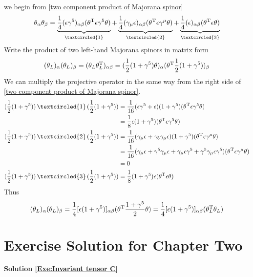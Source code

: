 we begin from \eqref{two component product of Majorana spinor}
\begin{equation}
\tht_{\a}\tht_{\be} = 
\underbrace{\frac{1}{4} (\e\g^5)_{\a\be} (\tht^{\tra}\e\g^5\tht)}_{\textcircled{1}}+ 
\underbrace{\frac{1}{4}(\g_{\m}\e)_{\a\be}({\tht}^{\tra}\e\g^{\m}\tht)}_{\textcircled{2}}+
\underbrace{\frac{1}{4}(\e)_{\a\be}(\tht^{\tra}\e\tht)}_{\textcircled{3}}
\notag
\end{equation} 
Write the product of two left-hand Majorana spinors
in matrix form
\begin{equation}
(\theta_L)_{\alpha}(\theta_L)_{\beta} 
=(\theta_L\theta_L^{\text{T}})_{\alpha\beta} 
=(\frac{1}{2}(1+\gamma^5)\theta)_{\alpha}
 (\theta^{\text{T}}\frac{1}{2}(1+\gamma^5))_{\beta} 
\end{equation} 
We can multiply the projective operator in the same way from the right side of \eqref{two component product of Majorana spinor}. 
\begin{align}
(\half(1+\g^5))\,\textcircled{1}\,(\half(1+\g^5)) 
& = \frac{1}{16} (\e\g^5+\e)(1+\g^5)
(\tht^{\tra}\e\g^5\tht)
\notag \\
& = \frac{1}{8}\e(1+\g^5)
(\tht^{\tra}\e\g^5\tht) \notag\\
(\half(1+\g^5))\,\textcircled{2}\,(\half(1+\g^5)) 
& = \frac{1}{16}
(\g_\m\e + \g_5\g_\m\e)(1+\g^5)
(\tht^{\tra}\e\g^{\m}\tht)
\notag\\
& =  \frac{1}{16}
(\g_\m\e + \g^5\g_\m\e + \g_\m\e\g^5 + \g^5\g_\m\e\g^5)
(\tht^{\tra}\e\g^{\m}\tht)
\notag\\
& = 0 \notag\\
(\half(1+\g^5))\,\textcircled{3}\,(\half(1+\g^5)) 
&  = \frac{1}{8}
(1+\g^5)\e 
(\tht^{\tra}\e\tht) \notag
\end{align}
Thus
\begin{equation}
(\theta_L)_{\alpha}(\theta_L)_{\beta} =
\frac{1}{4} [\epsilon(1+\gamma^5)]_{\alpha\beta}
(\theta^{\text{T}}\frac{1+\gamma^5}{2}\theta)=
\frac{1}{4} [\epsilon(1+\gamma^5)]_{\alpha\beta}
(\theta_L^{\text{T}}\theta_L)
\end{equation}

\section{Exercise Solution for Chapter Two}

\textbf{Solution \ref{Exe:Invariant tensor C}}

